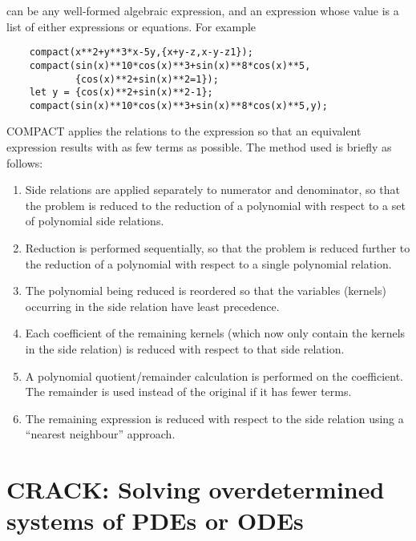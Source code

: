\documentclass[11pt,letterpaper]{book}
\begin{document}
 can be any well-formed algebraic expression, and
 an expression whose value is a list
of either expressions or equations.  For example

{\small\begin{verbatim}
    compact(x**2+y**3*x-5y,{x+y-z,x-y-z1});
    compact(sin(x)**10*cos(x)**3+sin(x)**8*cos(x)**5,
            {cos(x)**2+sin(x)**2=1});
    let y = {cos(x)**2+sin(x)**2-1};
    compact(sin(x)**10*cos(x)**3+sin(x)**8*cos(x)**5,y);
\end{verbatim}}

{COMPACT} applies the relations to the expression so that an equivalent
expression results with as few terms as possible.  The method used is
briefly as follows:

\begin{enumerate}
\item Side relations are applied separately to numerator and denominator, so
that the problem is reduced to the reduction of a polynomial with respect to
a set of polynomial side relations.

\item Reduction is performed sequentially, so that the problem is reduced
further to the reduction of a polynomial with respect to a single
polynomial relation.

\item The polynomial being reduced is reordered so that the variables
(kernels) occurring in the side relation have least precedence.

\item Each coefficient of the remaining kernels (which now only contain
the kernels
in the side relation) is reduced with respect to that side relation.

\item A polynomial quotient/remainder calculation is performed on the
coefficient.  The remainder is
used instead of the original if it has fewer terms.

\item The remaining expression is reduced with respect to the side relation
using a ``nearest neighbour'' approach.
\end{enumerate}

\chapter[CRACK: Overdetermined systems of DEs]%
        {CRACK: Solving overdetermined systems of PDEs or ODEs}
\label{CRACK}
\end{document}
